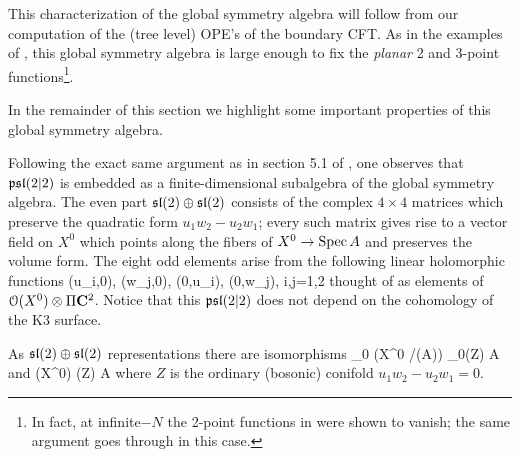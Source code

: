 \documentclass[../main.tex]{subfiles}
\begin{document}
This characterization of the global symmetry algebra will follow from our computation of the (tree level) OPE's of the boundary CFT. As in the examples of \cite{CostelloGaiotto, CP}, this global symmetry algebra is large enough to fix the \textit{planar} 2 and 3-point functions\footnote{In fact, at infinite$-N$ the 2-point functions in \cite{CP} were shown to vanish; the same argument goes through in this case.}.

In the remainder of this section we highlight some important properties of this global symmetry algebra.

Following the exact same argument as in section 5.1 of \cite{CP}, one observes that $\mathfrak{psl}(2|2)$ is embedded as a finite-dimensional subalgebra of the global symmetry algebra.
The even part $\mathfrak{sl}(2) \oplus \mathfrak{sl}(2)$ consists of the complex $4 \times 4$ matrices which preserve the quadratic form $u_1 w_2 - u_2 w_1$; every such matrix gives rise to a vector field on $X^0$ which points along the fibers of $X^0 \to \operatorname{Spec} A$ and preserves the volume form.
The eight odd elements arise from the following linear holomorphic functions 
\beqn
(u_i,0), (w_j,0), (0,u_i), (0,w_j), \quad i,j=1,2
\eeqn
thought of as elements of $\mathcal O(X^0) \otimes \Pi \mathbf{C}^2$.
Notice that this $\mathfrak{psl}(2|2)$ does not depend on the cohomology of the K3 surface.

As $\mathfrak{sl}(2) \oplus \mathfrak{sl}(2)$ representations there are isomorphisms
\beqn
{}_0 \left(X^0 \slash \Spec(A)\right) \cong {}_0(Z) \otimes A \\
\eeqn
and
\beqn
\cO(X^0) \cong \cO(Z) \otimes A
\eeqn
where $Z$ is the ordinary (bosonic) conifold $u_1 w_2 - u_2 w_1 = 0$.
\end{document}
